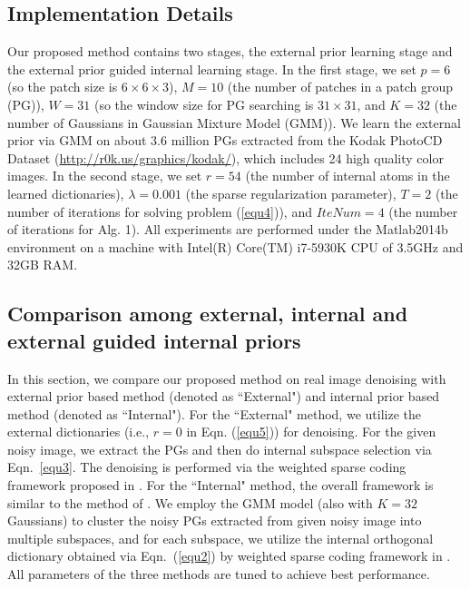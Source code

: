 \documentclass[10pt,twocolumn,letterpaper]{article}
\begin{document}
\subsection{Implementation Details}
Our proposed method contains two stages, the external prior learning stage and the external prior guided internal learning stage. In the first stage, we set $p = 6$ (so the patch size is $6\times 6 \times 3$), $M=10$ (the number of patches in a patch group (PG)), $W=31$ (so the window size for PG searching is $31\times31$, and $K=32$ (the number of Gaussians in Gaussian Mixture Model (GMM)). We learn the external prior via GMM on about 3.6 million PGs extracted from the Kodak PhotoCD Dataset (\url{http://r0k.us/graphics/kodak/}), which includes 24 high quality color images. In the second stage, we set $r=54$ (the number of internal atoms in the learned dictionaries), $\lambda=0.001$ (the sparse regularization parameter), $T=2$ (the number of iterations for solving problem (\ref{equ4})), and $IteNum=4$ (the number of iterations for Alg. 1). All experiments are performed under the Matlab2014b environment on a machine with Intel(R) Core(TM) i7-5930K CPU of 3.5GHz and 32GB RAM.

\subsection{Comparison among external, internal and external guided internal priors}
In this section, we compare our proposed method on real image denoising with external prior based method (denoted as ``External") and internal prior based method (denoted as ``Internal"). For the ``External" method, we utilize the external dictionaries (i.e., $r=0$ in Eqn. (\ref{equ5})) for denoising. For the given noisy image, we extract the PGs and then do internal subspace selection via Eqn.\ \ref{equ3}. The denoising is performed via the weighted sparse coding framework proposed in \cite{pgpd}. For the ``Internal" method, the overall framework is similar to the method of \cite{ncsr}. We employ the GMM model (also with $K=32$ Gaussians) to cluster the noisy PGs extracted from given noisy image into multiple subspaces, and for each subspace, we utilize the internal orthogonal dictionary obtained via Eqn.\ (\ref{equ2}) by weighted sparse coding framework in \cite{pgpd}. All parameters of the three methods are tuned to achieve best performance.
\end{document}
